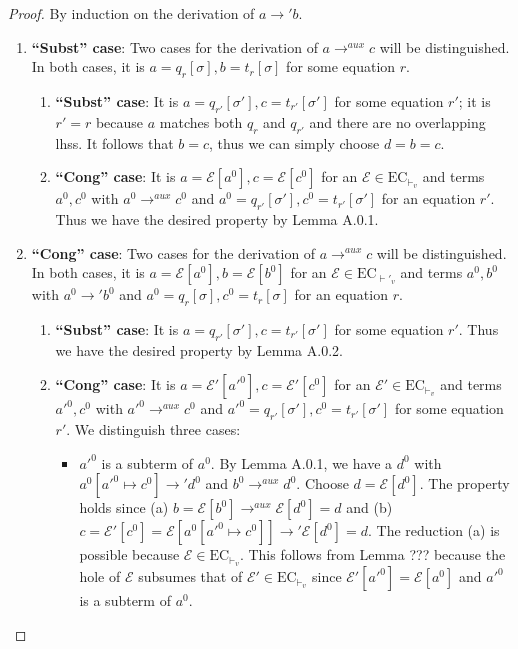 \cdpaux*
\begin{proof}
By induction on the derivation of $a \longrightarrow' b$.

\begin{enumerate}
\item \textbf{``Subst'' case}: Two cases for the derivation of $a \longrightarrow^{aux} c$ will be distinguished. In both cases, it is $a = q_r[\sigma], b = t_r[\sigma]$ for some equation $r$.

\begin{enumerate}
\item \textbf{``Subst'' case}: It is $a = q_{r'}[\sigma'], c = t_{r'}[\sigma']$ for some equation $r'$; it is $r' = r$ because $a$ matches both $q_r$ and $q_{r'}$ and there are no overlapping lhss. It follows that $b = c$, thus we can simply choose $d = b = c$.

\item \textbf{``Cong'' case}: It is $a = \mathcal{E}[a^0], c = \mathcal{E}[c^0]$ for an $\mathcal{E} \in \textrm{EC}_{\vdash_v}$ and terms $a^0, c^0$ with $a^0 \longrightarrow^{aux} c^0$ and $a^0 = q_{r'}[\sigma'], c^0 = t_{r'}[\sigma']$ for an equation $r'$. Thus we have the desired property by Lemma A.0.1.
\end{enumerate}

\item \textbf{``Cong'' case}: Two cases for the derivation of $a \longrightarrow^{aux} c$ will be distinguished. In both cases, it is $a = \mathcal{E}[a^0], b = \mathcal{E}[b^0]$ for an $\mathcal{E} \in \textrm{EC}_{\vdash'_v}$ and terms $a^0, b^0$ with $a^0 \longrightarrow' b^0$ and $a^0 = q_r[\sigma], c^0 = t_r[\sigma]$ for an equation $r$.

\begin{enumerate}
\item \textbf{``Subst'' case}: It is $a = q_{r'}[\sigma'], c = t_{r'}[\sigma']$ for some equation $r'$. Thus we have the desired property by Lemma A.0.2.

\item \textbf{``Cong'' case}: It is $a = \mathcal{E}'[a'^0], c = \mathcal{E}'[c^0]$ for an $\mathcal{E}' \in \textrm{EC}_{\vdash_v}$ and terms $a'^0, c^0$ with $a'^0 \longrightarrow^{aux} c^0$ and $a'^0 = q_{r'}[\sigma'], c^0 = t_{r'}[\sigma']$ for some equation $r'$. We distinguish three cases:
\begin{itemize}
\item $a'^0$ is a subterm of $a^0$. By Lemma A.0.1, we have a $d^0$ with $a^0[a'^0 \mapsto c^0] \longrightarrow' d^0$ and $b^0 \longrightarrow^{aux} d^0$. Choose $d = \mathcal{E}[d^0]$. The property holds since (a) $b = \mathcal{E}[b^0] \longrightarrow^{aux} \mathcal{E}[d^0] = d$ and (b) $c = \mathcal{E}'[c^0] = \mathcal{E}[a^0[a'^0 \mapsto c^0]] \longrightarrow' \mathcal{E}[d^0] = d$. The reduction (a) is possible because $\mathcal{E} \in \textrm{EC}_{\vdash_v}$. This follows from Lemma ??? because the hole of $\mathcal{E}$ subsumes that of $\mathcal{E}'  \in \textrm{EC}_{\vdash_v}$ since $\mathcal{E}'[a'^0] = \mathcal{E}[a^0]$ and $a'^0$ is a subterm of $a^0$.


\end{itemize}
\end{enumerate}
\end{enumerate}
\end{proof}
